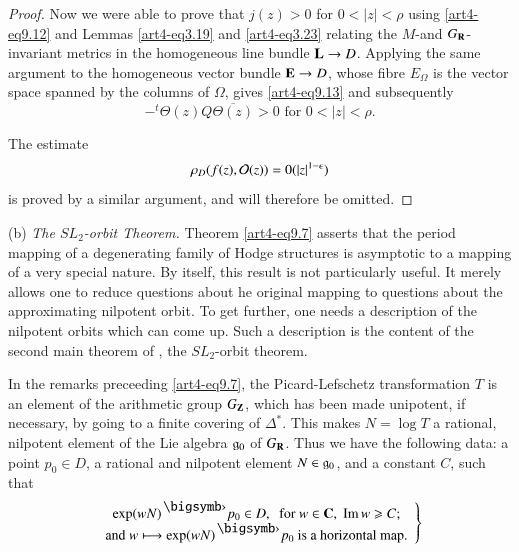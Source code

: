 \begin{proof}
Now we were able to prove that $j(z) > 0$ for $0 < |z| < \rho$ using \eqref{art4-eq9.12} and Lemmas \eqref{art4-eq3.19} and \eqref{art4-eq3.23} relating the $M$-and $G_{\mathbf{R}}$-invariant metrics in the homogeneous line bundle $\mathbf{L} \to D$. Applying the same argument to the homogeneous vector bundle $\mathbf{E} \to D$, whose fibre $E_\Omega$ is the vector space spanned by the columns of $\Omega$, gives \eqref{art4-eq9.13} and subsequently
$$
-^t \Theta (z) Q \overline{\Theta (z)} > 0 \text{ for } 0 < |z| < \rho.
$$

The estimate
$$
\rho_D (f (z), \mathcal{O}(z))  = 0 (|z|^{1-\epsilon})
$$
is proved by a similar argument, and will therefore be omitted.
\end{proof}

\noindent
(b) \textit{The $SL_2$-orbit Theorem.} Theorem \eqref{art4-eq9.7} asserts that the period mapping of a degenerating family of Hodge structures is asymptotic to a mapping of a very special nature. By itself, this result is not particularly useful. It merely allows one to reduce questions about he original mapping to questions about the approximating nilpotent orbit. To get further, one needs a description of the nilpotent orbits which can come up. Such a description is the content of the second main theorem of \cite{art4-key41}, the $SL_2$-orbit theorem.

In the remarks preceeding \eqref{art4-eq9.7}, the Picard-Lefschetz transformation $T$ is an element of the arithmetic group $G_{\mathbf{Z}}$, which has been made unipotent, if necessary, by going to a finite covering of $\Delta^\ast$. This makes $N = \log T$ a rational, nilpotent element of the Lie algebra $\mathfrak{g}_0$ of $G_{\mathbf{R}}$. Thus we have the following data: a point $p_0 \in D$, a rational and nilpotent element $N \in\mathfrak{g}_0$, and a constant  $C$, such that
\begin{equation}
\left.
\begin{array}{c}
\exp (w N)^\bigdot p_0 \in D, \; \text{ for } w \in \bC, \; \Iim w \geqslant C;\\
\text{and } w\longmapsto \exp (wN)^\bigdot p_0  \text{ is a horizontal map.}
\end{array}
\right\}
\label{art4-eq9.17}
\end{equation}

